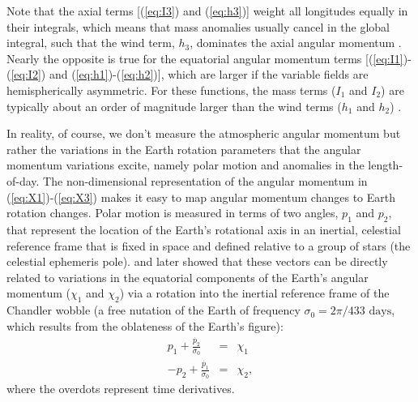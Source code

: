 Note that the axial terms [(\ref{eq:I3}) and (\ref{eq:h3})] weight all longitudes equally in their integrals, which means that mass anomalies usually cancel in the global integral, such that the wind term, $h_3$, dominates the axial angular momentum  \citep{barnesetal1983}.
%
Nearly the opposite is true for the equatorial angular momentum terms [(\ref{eq:I1})-(\ref{eq:I2}) and (\ref{eq:h1})-(\ref{eq:h2})], which are larger if the variable fields are hemispherically asymmetric.
For these functions, the mass terms ($I_1$ and $I_2$) are typically about an order of magnitude larger than the wind terms ($h_1$ and $h_2$)  \citep{barnesetal1983}.


In reality, of course, we don't measure the atmospheric angular momentum but rather the variations in the Earth rotation parameters that the angular momentum variations excite, namely polar motion and anomalies in the length-of-day. 
The non-dimensional representation of the angular momentum in (\ref{eq:X1})-(\ref{eq:X3}) makes it easy to map angular momentum changes to Earth rotation changes. 
Polar motion is measured in terms of two angles, $p_1$ and $p_2$, that represent the location of the Earth's rotational axis in an inertial, celestial reference frame that is fixed in space and defined relative to a group of stars (the celestial ephemeris pole).
\citet{barnesetal1983} and later \citet{Gross1992} showed that these vectors can be directly related to variations in the equatorial components of the Earth's angular momentum ($\chi_1$ and $\chi_2$) via a rotation into the inertial reference frame of the Chandler wobble (a free nutation of the Earth of frequency 
$\sigma_0 = 2\pi/ 433 \text{~days}$, which results from the oblateness of the Earth's figure):
\begin{eqnarray}
  p_1 + \frac{\dot{p_2}}{\sigma_0} &=& \chi_1 \\
  -p_2 + \frac{\dot{p_1}}{\sigma_0} &=& \chi_2,
\label{eq:X12_to_PM}
\end{eqnarray}
where the overdots represent time derivatives.

